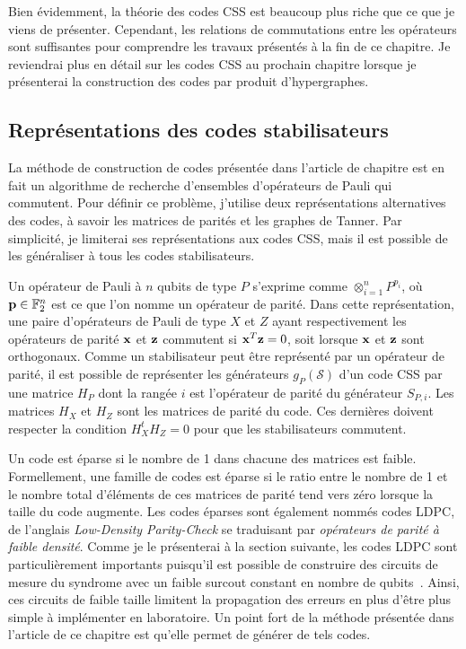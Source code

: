 Bien évidemment,
la théorie des codes CSS est beaucoup plus riche que ce que je viens de présenter.
Cependant,
les relations de commutations entre les opérateurs sont suffisantes pour comprendre
les travaux présentés à la fin de ce chapitre.
Je reviendrai plus en détail sur les codes CSS au prochain chapitre lorsque je présenterai
la construction des codes par produit d'hypergraphes.
 
\subsection{Représentations des codes stabilisateurs}
\label{sec:representations_codes}

La méthode de construction de codes présentée dans l'article de chapitre est en fait un algorithme
de recherche d'ensembles d'opérateurs de Pauli qui commutent.
Pour définir ce problème,
j'utilise deux représentations alternatives des codes, à savoir les matrices de parités et les graphes de Tanner.
Par simplicité,
je limiterai ses représentations aux codes CSS,
mais il est possible de les généraliser à tous les codes stabilisateurs.

Un opérateur de Pauli à $n$ qubits de type $P$ s'exprime comme $\otimes_{i=1}^{n} P^{p_i}$,
où $\vb p \in \mathbb{F}_{2}^{n}$ est ce que l'on nomme un opérateur de parité.
Dans cette représentation,
une paire d'opérateurs de Pauli de type $X$ et $Z$ ayant respectivement les opérateurs de parité $\vb x$ 
et $\vb z$ commutent si $\vb x^T \vb z = 0$,
soit lorsque $\vb x$ et $\vb z$ sont orthogonaux.
Comme un stabilisateur peut être représenté par un opérateur de parité,
il est possible de représenter les générateurs $g_P(\mathcal S)$ d'un code CSS
par une matrice $H_P$ dont la rangée $i$ est l'opérateur de parité du
générateur $S_{P, i}$.
Les matrices $H_X$ et $H_Z$ sont les matrices de parité du code.
Ces dernières doivent respecter la condition $H_X^t H_Z = 0$ pour 
que les stabilisateurs commutent.

Un code est éparse si le nombre de 1 dans chacune des matrices est faible.
Formellement,
une famille de codes est éparse si le ratio entre le nombre de 1 
et le nombre total d'éléments de ces matrices de parité tend vers zéro 
lorsque la taille du code augmente.
Les codes éparses sont également nommés codes LDPC,
de l'anglais \textit{Low-Density Parity-Check} se traduisant par
\textit{opérateurs de parité à faible densité}.
Comme je le présenterai à la section suivante,
les codes LDPC sont particulièrement importants puisqu'il est possible de construire
des circuits de mesure du syndrome avec un faible surcout
constant en nombre de qubits~\cite{gottesman_fault-tolerant_2013}.
Ainsi,
ces circuits de faible taille limitent la propagation des erreurs en plus d'être plus simple à 
implémenter en laboratoire.
Un point fort de la méthode présentée dans l'article de ce chapitre est qu'elle permet 
de générer de tels codes.

